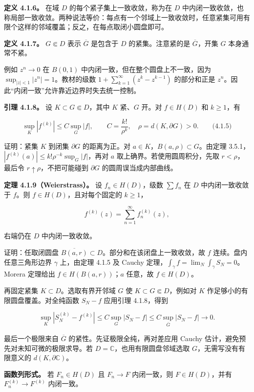 \documentclass[11pt,a4paper]{article}
\begin{document}
\textbf{定义 4.1.6。} 在域 \(D\) 的每个紧子集上一致收敛，称为在 \(D\)
中内闭一致收敛，也称局部一致收敛。两种说法等价：每点有一个邻域上一致收敛时，任意紧集可用有限个这样的邻域覆盖；反之，在每点取闭小圆盘即可。

\textbf{定义 4.1.7。} \(G\Subset D\) 表示 \(\overline G\) 是包含于 \(D\)
的紧集。注意紧的是 \(\overline G\)，开集 \(G\) 本身通常不紧。

例如 \(z^n\to0\) 在 \(B(0,1)\) 中内闭一致，但在整个圆盘上不一致，因为
\(\sup_{|z|<1}|z^n|=1\)。教材的级数
\(1+\sum_{k=1}^{\infty}(z^k-z^{k-1})\) 的部分和正是
\(z^n\)。因此``内闭一致''允许靠近边界时失去统一控制。

\textbf{引理 4.1.8。} 设 \(K\subset G\Subset D\)，其中 \(K\) 紧、\(G\)
开。对 \(f\in H(D)\) 和 \(k\ge1\)，有

\[
\sup_K|f^{(k)}|\le C\sup_G|f|,
\qquad C=\frac{k!}{\rho^k},\quad \rho=d(K,\partial G)>0.
\qquad\text{(4.1.5)}
\]

证明：紧集 \(K\) 到闭集 \(\partial G\) 的距离为正。对
\(a\in K\)，\(B(a,\rho)\subset G\)。由定理
3.5.1，\(|f^{(k)}(a)|\le k!\rho^{-k}\sup_G|f|\)，再对 \(a\)
取上确界。若使用圆周积分，先取 \(r<\rho\)，最后令
\(r\uparrow\rho\)，不把可能碰到 \(\partial G\) 的圆周误当成内部曲线。

\textbf{定理 4.1.9（Weierstrass）。} 设 \(f_n\in H(D)\)，级数
\(\sum f_n\) 在 \(D\) 中内闭一致收敛于 \(f\)。则
\(f\in H(D)\)，且对每个固定的 \(k\ge1\)，

\[
f^{(k)}(z)=\sum_{n=1}^{\infty}f_n^{(k)}(z),
\]

右端仍在 \(D\) 中内闭一致收敛。

证明：任取闭圆盘
\(\overline{B(a,r)}\subset D\)。部分和在该闭盘上一致收敛，故 \(f\)
连续。盘内任意三角形边界 \(\gamma\) 上，由定理 4.1.5 及 Cauchy
定理，\(\int_\gamma f=\lim_N\int_\gamma S_N=0\)。Morera 定理给出
\(f\in H(B(a,r))\)；\(a\) 任意，故 \(f\in H(D)\)。

再固定紧集 \(K\subset D\)。选取有界开邻域 \(G\) 使
\(K\subset G\Subset D\)，例如对 \(K\) 作足够小的有限圆盘覆盖。对全纯函数
\(S_N-f\) 应用引理 4.1.8，得到

\[
\sup_K|S_N^{(k)}-f^{(k)}|
\le C\sup_G|S_N-f|
\le C\sup_{\overline G}|S_N-f|\longrightarrow0.
\]

最后一个极限来自 \(\overline G\) 的紧性。先证极限全纯，再对差应用 Cauchy
估计，避免预先对未知可微的极限求导。若
\(D=\mathbb C\)，也用有限圆盘邻域选取 \(G\)，无需写没有有限意义的
\(d(K,\partial\mathbb C)\)。

\textbf{函数列形式。} 若 \(F_n\in H(D)\) 且 \(F_n\to F\) 内闭一致，则
\(F\in H(D)\)，并有 \(F_n^{(k)}\to F^{(k)}\) 内闭一致。
\end{document}
